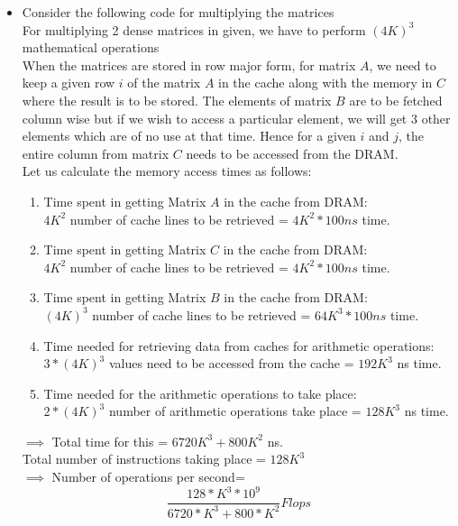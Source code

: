 \documentclass[11pt]{article}
\begin{document}
\begin{enumerate}
\begin{itemize}
		\item Consider the following code for multiplying the matrices \\
				
				For multiplying 2 dense matrices in given, we have to perform $(4K)^3$ mathematical operations \\
				When the matrices are stored in row major form, for matrix $A$, we need to keep a given row $i$ of the matrix $A$ in the cache along with the memory in $C$ where the result is to be stored.
				The elements of matrix $B$ are to be fetched column wise but if we wish to access a particular element, we will get 3 other elements which are of no use at that time.
				Hence for a given $i$ and $j$, the entire column from matrix $C$ needs to be accessed from the DRAM. \\
				Let us calculate the memory access times as follows: \\
				\begin{enumerate}
					\item Time spent in getting Matrix $A$ in the cache from DRAM: \\
							$4K^2$ number of cache lines to be retrieved = $4K^2 * 100ns$ time.
					\item Time spent in getting Matrix $C$ in the cache from DRAM: \\
							$4K^2$ number of cache lines to be retrieved = $4K^2 * 100ns$ time.
					\item Time spent in getting Matrix $B$ in the cache from DRAM: \\
							$(4K)^3$ number of cache lines to be retrieved = $64K^3 * 100ns$ time.
					\item Time needed for retrieving data from caches for arithmetic operations: \\
							$3*(4K)^3$ values need to be accessed from the cache = $192K^3$ ns time. \\
					\item Time needed for the arithmetic operations to take place: \\
							$2*(4K)^3$ number of arithmetic operations take place = $128K^3$ ns time.
				\end{enumerate}
				$\implies$ Total time for this = $6720K^3 + 800K^2$ ns. \\
				Total number of instructions taking place = $128K^3$ \\
				$\implies$ Number of operations per second= \\
				\[
					\frac{128*K^3 * 10^9}{6720*K^3 + 800*K^2} Flops
\]
\end{itemize}
\end{enumerate}
\end{document}

